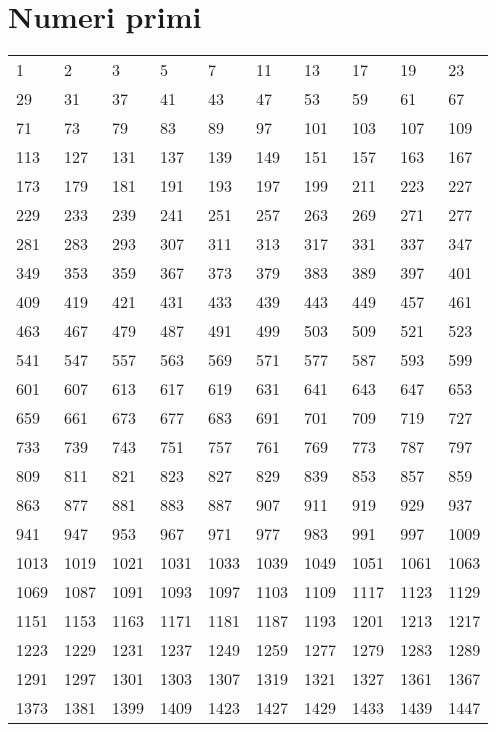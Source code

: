 
\section{Numeri primi}
\label{sec:TabellaNumeriPrrimi}
\begin{center}
	\begin{tabular}{llllllllll}
\toprule
1 &2 &3 &5 &7 &11 &13 &17 &19 &23 \\
29 &31 &37 &41 &43 &47 &53 &59 &61 &67 \\
71 &73 &79 &83 &89 &97 &101 &103 &107 &109 \\
113 &127 &131 &137 &139 &149 &151 &157 &163 &167 \\
173 &179 &181 &191 &193 &197 &199 &211 &223 &227 \\
229 &233 &239 &241 &251 &257 &263 &269 &271 &277 \\
281 &283 &293 &307 &311 &313 &317 &331 &337 &347 \\
349 &353 &359 &367 &373 &379 &383 &389 &397 &401 \\
409 &419 &421 &431 &433 &439 &443 &449 &457 &461 \\
463 &467 &479 &487 &491 &499 &503 &509 &521 &523 \\
541 &547 &557 &563 &569 &571 &577 &587 &593 &599 \\
601 &607 &613 &617 &619 &631 &641 &643 &647 &653 \\
659 &661 &673 &677 &683 &691 &701 &709 &719 &727 \\
733 &739 &743 &751 &757 &761 &769 &773 &787 &797 \\
809 &811 &821 &823 &827 &829 &839 &853 &857 &859 \\
863 &877 &881 &883 &887 &907 &911 &919 &929 &937 \\
941 &947 &953 &967 &971 &977 &983 &991 &997 &1009 \\
1013 &1019 &1021 &1031 &1033 &1039 &1049 &1051 &1061 &1063 \\
1069 &1087 &1091 &1093 &1097 &1103 &1109 &1117 &1123 &1129 \\
1151 &1153 &1163 &1171 &1181 &1187 &1193 &1201 &1213 &1217 \\
1223 &1229 &1231 &1237 &1249 &1259 &1277 &1279 &1283 &1289 \\
1291 &1297 &1301 &1303 &1307 &1319 &1321 &1327 &1361 &1367 \\
1373 &1381 &1399 &1409 &1423 &1427 &1429 &1433 &1439 &1447 \\

\end{tabular}
\end{center}
